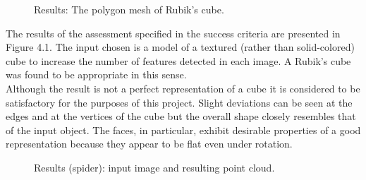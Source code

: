 \documentclass[12pt,a4paper,twoside,openright]{report}
\begin{document}
\begin{figure}
\begin{minipage}{.25\linewidth}
\centering
{}
\end{minipage}%
\begin{minipage}{.25\linewidth}
\centering
{}
\end{minipage}%
\begin{minipage}{.25\linewidth}
\centering
{}
\end{minipage}%
\begin{minipage}{.25\linewidth}
\centering
{}
\end{minipage}\par\medskip
\caption{Results: The polygon mesh of Rubik's cube.\\}
\label{fig:main}
\end{figure}


The results of the assessment specified in the success criteria are presented in Figure 4.1. The input chosen is a model of a textured (rather than solid-colored) cube to increase the number of features detected in each image. A Rubik's cube was found to be appropriate in this sense.\\
Although the result is not a perfect representation of a cube it is considered to be satisfactory for the purposes of this project. Slight deviations can be seen at the edges and at the vertices of the cube but the overall shape closely resembles that of the input object. The faces, in particular, exhibit desirable properties of a good representation because they appear to be flat even under rotation.\\
\linebreak
\begin{figure}
\begin{minipage}{.5\linewidth}
\centering
{}
\end{minipage}%
\begin{minipage}{.5\linewidth}
\centering
{}
\end{minipage}\par\medskip
\caption{Results (spider): input image and resulting point cloud.\protect\footnotemark}
\label{fig:main}
\end{figure}
\end{document}
